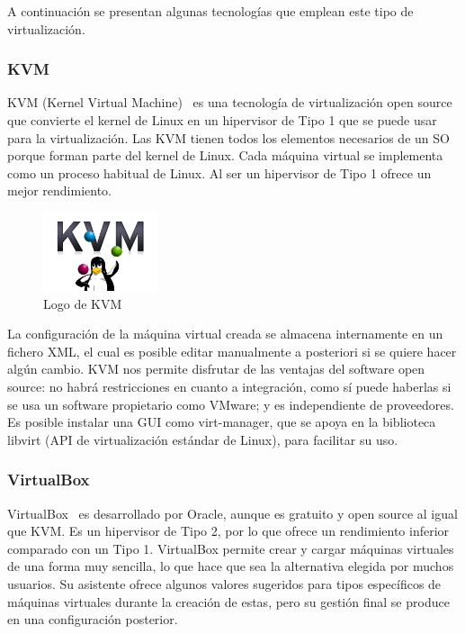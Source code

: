 	A continuación se presentan algunas tecnologías que emplean este tipo de virtualización.
	\clearpage

\subsubsection{KVM}
	KVM (Kernel Virtual Machine)~\cite{kvm} es una tecnología de virtualización open source que convierte el kernel de Linux en un hipervisor de Tipo 1 que se puede usar para la virtualización. Las KVM tienen todos los elementos necesarios de un SO porque forman parte del kernel de Linux. Cada máquina virtual se implementa como un proceso habitual de Linux. Al ser un hipervisor de Tipo 1 ofrece un mejor rendimiento. 

	\begin{figure}[h]
	\centering
	\includegraphics[width=0.3\textwidth]{../imgs/EdA/kvm.png}
	\caption{Logo de KVM}
	\label{fig:kvm}
	\end{figure}

	La configuración de la máquina virtual creada se almacena internamente en un fichero XML, el cual es posible editar manualmente a posteriori si se quiere hacer algún cambio. KVM nos permite disfrutar de las ventajas del software open source: no habrá restricciones en cuanto a integración, como sí puede haberlas si se usa un software propietario como VMware; y es independiente de proveedores. Es posible instalar una GUI como virt-manager, que se apoya en la biblioteca libvirt (API de virtualización estándar de Linux), para facilitar su uso.

\subsubsection{VirtualBox}
	VirtualBox~\cite{vbox} es desarrollado por Oracle, aunque es gratuito y open source al igual que KVM. Es un hipervisor de Tipo 2, por lo que ofrece un rendimiento inferior comparado con un Tipo 1. VirtualBox permite crear y cargar máquinas virtuales de una forma muy sencilla, lo que hace que sea la alternativa elegida por muchos usuarios. Su asistente ofrece algunos valores sugeridos para tipos específicos de máquinas virtuales durante la creación de estas, pero su gestión final se produce en una configuración posterior.

